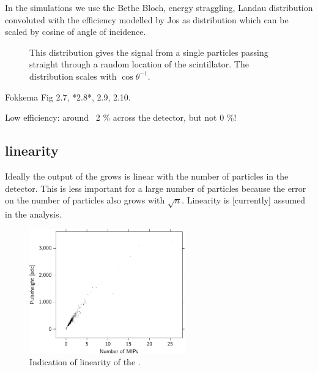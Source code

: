 In the simulations we use the Bethe Bloch, energy straggling, Landau
distribution convoluted with the efficiency modelled by Jos as
distribution which can be scaled by cosine of angle of incidence.

\begin{figure}
    \centering
    
    \caption{ This distribution gives
             the signal from a single particles passing straight through
             a random location of the scintillator. The distribution
             scales with $\cos{\theta}^{-1}$.}
    \label{fig:signal_efficiency}
\end{figure}

Fokkema Fig 2.7, *2.8*, 2.9, 2.10.

Low efficiency: around ~2 \% across the detector, but not 0 \%!


\subsection{\pmt linearity}

Ideally the output of the \pmt grows is linear with the number of
particles in the detector. This is less important for a large number of
particles because the error on the number of particles also grows with
$\sqrt{n}$. Linearity is [currently] assumed in the analysis.

\begin{figure}
    \centering
    \includegraphics[width=0.6\textwidth]{plots/response/ph_vs_pi.pdf}
    \caption{
             Indication of linearity of the \pmt.}
    \label{fig:transport_time}
\end{figure}


\subsection{\adcs}

